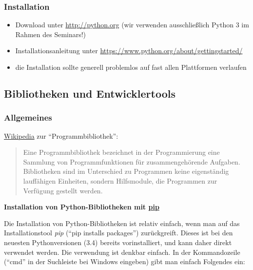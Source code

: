 \subsubsection{\texorpdfstring{{Installation}}{Installation}}

\begin{itemize}
\itemsep1pt\parskip0pt
\item
  {Download unter \url{http://python.org} (wir verwenden ausschließlich
  Python 3 im Rahmen des Seminars!)}
\item
  {Installationsanleitung unter
  \url{https://www.python.org/about/gettingstarted/}}
\item
  {die Installation sollte generell problemlos auf fast allen
  Plattformen verlaufen}
\end{itemize}

\subsection{\texorpdfstring{{Bibliotheken und
Entwicklertools}}{Bibliotheken und Entwicklertools}}

\subsubsection{\texorpdfstring{{Allgemeines}}{Allgemeines}}

\href{http://de.wikipedia.org/wiki/Programmbibliothek}{Wikipedia} zur
``Programmbibliothek'':

\begin{quote}
Eine Programmbibliothek bezeichnet in der Programmierung eine Sammlung
von Programmfunktionen für zusammengehörende Aufgaben. Bibliotheken sind
im Unterschied zu Programmen keine eigenständig lauffähigen Einheiten,
sondern Hilfsmodule, die Programmen zur Verfügung gestellt werden.
\end{quote}

\par\noindent\textbf{Installation von Python-Bibliotheken mit
\href{http://pypa.io}{pip}}

Die Installation von Python-Bibliotheken ist relativ einfach, wenn man
auf das Installationstool \emph{pip} (``pip installs packages'')
zurückgreift. Dieses ist bei den neuesten Pythonversionen (3.4) bereits
vorinstalliert, und kann daher direkt verwendet werden. Die verwendung
ist denkbar einfach. In der Kommandozeile (``cmd'' in der Suchleiste bei
Windows eingeben) gibt man einfach Folgendes ein:

